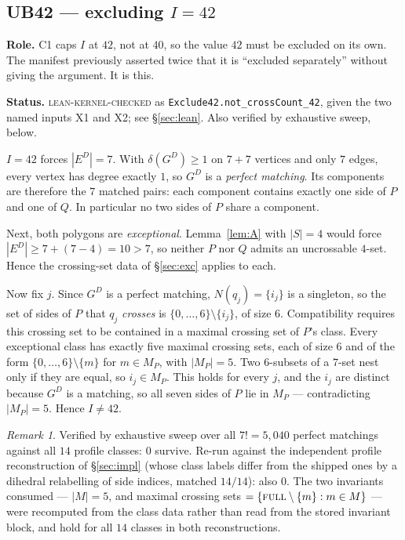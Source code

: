 \documentclass[11pt,a4paper]{article}
\theoremstyle{plain}
\theoremstyle{definition}
\theoremstyle{remark}
\newtheorem*{remark}{Remark}
\newcommand{\GD}{G^{D}}
\newcommand{\ED}{E^{D}}
\newcommand{\stat}[1]{\footnotesize\textsc{#1}}
\begin{document}
\subsection{\texorpdfstring{\textsf{UB42} --- excluding $I=42$}{UB42 -- excluding I = 42}}\label{sec:i42}

\textbf{Role.} \textsf{C1} caps $I$ at $42$, not at $40$, so the value $42$ must
be excluded on its own. The manifest previously asserted twice that it is
``excluded separately'' without giving the argument. It is this.

\textbf{Status.} \stat{lean-kernel-checked} as
\texttt{Exclude42.not\_crossCount\_42}, given the two named inputs \textsf{X1}
and \textsf{X2}; see \S\ref{sec:lean}. Also verified by exhaustive sweep, below.

$I=42$ forces $|\ED|=7$. With $\delta(\GD)\ge1$ on $7+7$ vertices and only $7$
edges, every vertex has degree exactly $1$, so $\GD$ is a \emph{perfect
matching}. Its components are therefore the $7$ matched pairs: each component
contains exactly one side of $P$ and one of $Q$. In particular no two sides of
$P$ share a component.

Next, both polygons are \emph{exceptional}. Lemma~\ref{lem:A} with $|S|=4$ would
force $|\ED|\ge 7+(7-4)=10>7$, so neither $P$ nor $Q$ admits an uncrossable
$4$-set. Hence the crossing-set data of \S\ref{sec:exc} applies to each.

Now fix $j$. Since $\GD$ is a perfect matching, $N(q_j)=\{i_j\}$ is a singleton,
so the set of sides of $P$ that $q_j$ \emph{crosses} is
$\{0,\dots,6\}\setminus\{i_j\}$, of size $6$. Compatibility requires this
crossing set to be contained in a maximal crossing set of $P$'s class. Every
exceptional class has exactly five maximal crossing sets, each of size $6$ and of
the form $\{0,\dots,6\}\setminus\{m\}$ for $m\in M_P$, with $|M_P|=5$. Two
$6$-subsets of a $7$-set nest only if they are equal, so $i_j\in M_P$. This holds
for every $j$, and the $i_j$ are distinct because $\GD$ is a matching, so all
seven sides of $P$ lie in $M_P$ --- contradicting $|M_P|=5$. Hence $I\neq42$.

\begin{remark}
Verified by exhaustive sweep over all $7!=5{,}040$ perfect matchings against all
$14$ profile classes: $0$ survive. Re-run against the independent profile
reconstruction of \S\ref{sec:impl} (whose class labels differ from the shipped
ones by a dihedral relabelling of side indices, matched $14/14$): also $0$. The
two invariants consumed --- $|M|=5$, and maximal crossing sets
$=\{\textsc{full}\setminus\{m\}: m\in M\}$ --- were recomputed from the class data
rather than read from the stored invariant block, and hold for all $14$ classes
in both reconstructions.
\end{remark}
\end{document}
